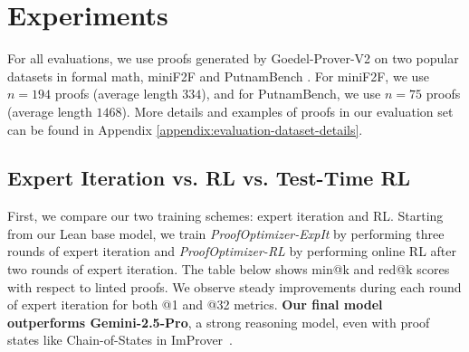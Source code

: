 \vspace{-1em}
\section{Experiments}
\label{sec:experiments}
\vspace{-0.5em}
For all evaluations, we use proofs generated by Goedel-Prover-V2 \citep{lin2025goedel} on two popular datasets in formal math, miniF2F \citep{zheng2021minif2f} and PutnamBench \citep{tsoukalas2024putnambench}. For miniF2F, we use $n=194$ proofs (average length $334$), and for PutnamBench, we use $n=75$ proofs (average length $1468$). More details and examples of proofs in our evaluation set can be found in Appendix \ref{appendix:evaluation-dataset-details}.

\subsection{Expert Iteration vs. RL vs. Test-Time RL}
\label{sec:expit-rl}
First, we compare our two training schemes: expert iteration and RL. Starting from our Lean base model, we train \textit{ProofOptimizer-ExpIt} by performing three rounds of expert iteration and \textit{ProofOptimizer-RL} by performing online RL after two rounds of expert iteration. The table below shows min@k and red@k scores with respect to linted proofs. We observe steady improvements during each round of expert iteration for both @1 and @32 metrics. \textbf{Our final model outperforms Gemini-2.5-Pro}, a strong reasoning model, even with proof states like Chain-of-States in ImProver~\citep{ahuja2024improver}.

